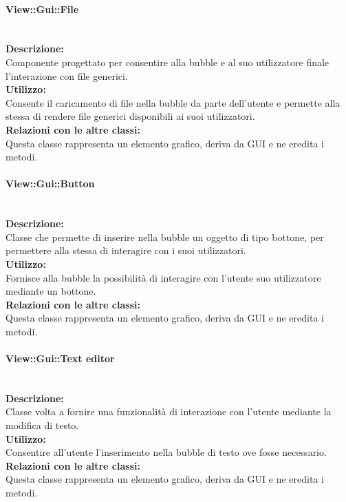 \paragraph{View::Gui::File}\label{gui-file}\mbox{}\\
\textbf{Descrizione:}\\
Componente progettato per consentire alla bubble e al suo utilizzatore finale l'interazione con file generici.\\
\textbf{Utilizzo:}\\
Consente il caricamento di file nella bubble da parte dell'utente e permette alla stessa di rendere file generici disponibili ai suoi utilizzatori.\\
\textbf{Relazioni con le altre classi:}\\
Questa classe rappresenta un elemento grafico, deriva da GUI e ne eredita i metodi.\\

\paragraph{View::Gui::Button}\label{gui-button}\mbox{}\\
\textbf{Descrizione:}\\
Classe che permette di inserire nella bubble un oggetto di tipo bottone, per permettere alla stessa di interagire con i suoi utilizzatori.\\
\textbf{Utilizzo:}\\
Fornisce alla bubble la possibilità di interagire con l'utente suo utilizzatore mediante un bottone.\\
\textbf{Relazioni con le altre classi:}\\
Questa classe rappresenta un elemento grafico, deriva da GUI e ne eredita i metodi.\\

\paragraph{View::Gui::Text editor}\label{gui-teditor}\mbox{}\\
\textbf{Descrizione:}\\
Classe volta a fornire una funzionalità di interazione con l'utente mediante la modifica di testo.\\
\textbf{Utilizzo:}\\
Consentire all'utente l'inserimento nella bubble di testo ove fosse necessario.\\
\textbf{Relazioni con le altre classi:}\\
Questa classe rappresenta un elemento grafico, deriva da GUI e ne eredita i metodi.\\

